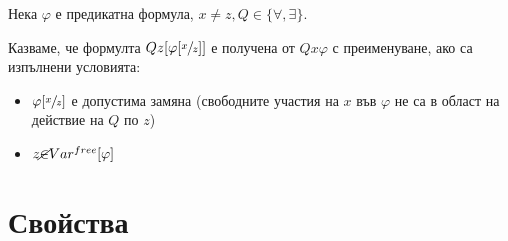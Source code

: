 \documentclass{article}
\def\Properties{1}
\begin{document}
\begin{mydef}
Нека $\varphi$ е предикатна формула, $x \neq z, Q \in \{\forall, \exists\}$.

Казваме, че формулта $Qz[\varphi[\sfrac{x}{z}]]$ е получена от $Qx\varphi$ с преименуване, ако са изпълнени условията:
\begin{itemize}
\item $\varphi[\sfrac{x}{z}]$ е допустима замяна (свободните участия на $x$ във $\varphi$ не са в област на действие на $Q$ по $z$)
\item $z \cancel{\in} Var^{free}[\varphi]$
\end{itemize}
\end{mydef}


\newpage
\fi

\ifcase\Properties\or
\section*{Свойства}
\end{document}
